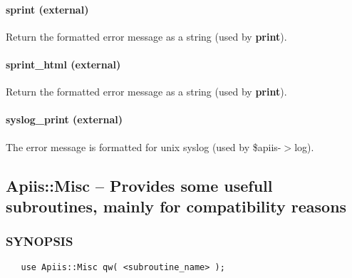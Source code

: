 \paragraph*{sprint (external)\label{Apiis::Errors_--_Provide_error_objects_for_generic_error_handling_in_APIIS_sprint_external_}}


Return the formatted error message as a string (used by \textbf{print}).

\paragraph*{sprint\_html (external)\label{Apiis::Errors_--_Provide_error_objects_for_generic_error_handling_in_APIIS_sprint_html_external_}}


Return the formatted error message as a string (used by \textbf{print}).

\paragraph*{syslog\_print (external)\label{Apiis::Errors_--_Provide_error_objects_for_generic_error_handling_in_APIIS_syslog_print_external_}}


The error message is formatted for unix syslog (used by \$apiis-$>$log).

\subsection{Apiis::Misc -- Provides some usefull subroutines, mainly for compatibility reasons\label{Apiis::Misc_--_Provides_some_usefull_subroutines_mainly_for_compatibility_reasons}}




\subsubsection*{SYNOPSIS\label{Apiis::Misc_--_Provides_some_usefull_subroutines_mainly_for_compatibility_reasons_SYNOPSIS}}
\begin{verbatim}
   use Apiis::Misc qw( <subroutine_name> );
\end{verbatim}
